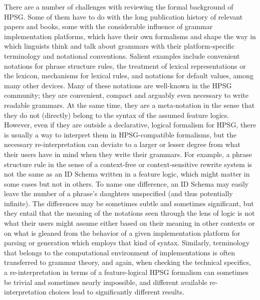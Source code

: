 \documentclass[output=paper,biblatex,babelshorthands,newtxmath,draftmode,colorlinks,citecolor=brown]{langscibook}
\begin{document}
There are a number of challenges with reviewing the formal background
of HPSG. Some of them have to do with the long publication history of relevant papers and books, some
with the considerable influence of grammar implementation platforms, which have
their own formalisms and shape the way in which
linguists think and talk about grammars with their platform-specific terminology
and notational conventions. %
Salient examples include convenient
notations for phrase structure rules, the treatment of lexical
representations or the lexicon, mechanisms for lexical rules, and
notations for default values, among many other devices.  Many of these
notations are well-known in the HPSG community; they are convenient,
compact and arguably even necessary to write readable grammars. At
the same time, they are
a meta-notation in the sense that they
do not (directly) belong to the syntax of the assumed feature logics.
However, even if they are outside a declarative, logical formalism for HPSG,
there is usually a way to
interpret them in HPSG-compatible formalisms, but the necessary
re-interpretation can deviate to a larger or lesser degree from
what their users have in mind when they write their grammars. For example,
a phrase structure rule in the sense of a context-free or context-sensitive
rewrite system is not the same as an ID Schema written in a feature logic, which
might matter in some cases but not in others. To name one difference,
an ID Schema may easily leave the number of a phrase's daughters unspecified (and
thus potentially infinite).
The differences may be sometimes subtle and sometimes significant, but
they entail that the meaning of the notations seen through the lens
of logic is not what their users might assume either
based on their meaning in other contexts or on what is gleaned 
from the behavior
of a given implementation platform for parsing or generation which
employs that kind of syntax.
Similarly, terminology that belongs to the computational environment
of implementations is often transferred to grammar theory, and
again, when checking the technical specifics, a re-interpretation in terms of a feature-logical HPSG
formalism can sometimes be trivial and sometimes nearly impossible,
and different available re-interpretation choices
lead to significantly different results.
\end{document}
